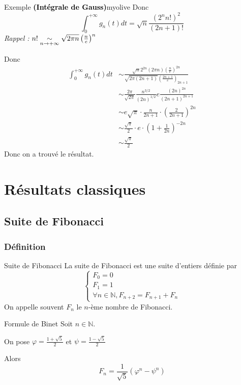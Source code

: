 \begin{omed}{Exemple \textbf{\textcolor{black}{(Intégrale de Gauss)}}}{myolive}
        Donc 
        \[ \int_{0}^{+\infty} g_n(t)dt = \sqrt{n} \frac{\left(2^n n!\right)^2}{(2n+1)!} \] 
        \textit{\textcolor{myolive}{Rappel :}} $n! \underset{n \rightarrow +\infty}{\sim} \sqrt{2\pi n} \left(\frac{n}{e}\right)^n$ 

        Donc 
        \begin{align*}
            \int_{0}^{+\infty} g_n(t)dt  
            &\sim \frac{\sqrt{n} 2^{2n} (2\pi n) \left(\frac{n}{e}\right)^{2n}}{\sqrt{2\pi(2n+1)} \left(\frac{2n+1}{e}\right)_{2n+1}} \\
            &\sim \frac{2\pi}{\sqrt{2 \pi}} \frac{n^{3 / 2}}{(2n)^{1/2}} e \frac{(2n)^{2n}}{(2n+1)^{2n+1}} \\
            &\sim e\sqrt{\pi} \cdot \frac{n}{2n+1} \cdot \left(\frac{2}{2n+1}\right)^{2n} \\
            &\sim \frac{\sqrt{\pi}}{2} \cdot e \cdot \left(1 + \frac{1}{2n}\right)^{-2n} \\
            &\sim \frac{\sqrt{\pi}}{2}
        \end{align*}
        Donc on a trouvé le résultat.
    \end{omed}

\section{Résultats classiques}

\subsection{Suite de Fibonacci}

    \subsubsection{Définition}

    \begin{defi}{Suite de Fibonacci}{}
        La suite de Fibonacci est une suite d’entiers définie par 
        \[ \left\{ \begin{array}{l}
            F_0 = 0 \\
            F_1 = 1 \\
            \forall n \in \mathbb{N}, F_{n+2} = F_{n+1} + F_{n}
        \end{array} \right. \]
        On appelle souvent $F_n$ le $n$-ème nombre de Fibonacci.
    \end{defi}

    \begin{prop}{Formule de Binet}{}
        Soit $n \in \mathbb{N}$.

        On pose $\varphi = \frac{1+\sqrt{5}}{2}$ et $\psi = \frac{1-\sqrt{5}}{2}$
        
        Alors \[ F_n = \frac{1}{\sqrt{5}}(\varphi^n - \psi^n) \]
    \end{prop}

